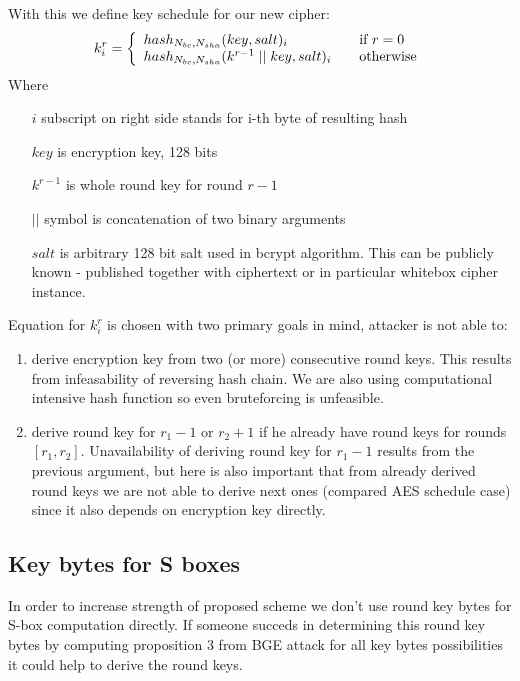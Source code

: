\documentclass[11pt,oneside,final]{fithesis2}
\begin{document}
    With this we define key schedule for our new cipher:
    \begin{equation}\label{eq:keySchedule}
    k_i^r = \left\{ 
    \begin{array}{l l} 
	hash_{N_{bc}, N_{sha}}(key, salt)_i                   & \quad \text{if $r=0$}\\
	hash_{N_{bc}, N_{sha}}(k^{r-1} \; || \;  key, salt)_i & \quad \text{otherwise}
    \end{array} \right.
    \end{equation}
    Where
    \begin{itemize}
     \item[$i$] subscript on right side stands for i-th byte of resulting hash
     \item[$key$] is encryption key, 128 bits
     \item[$k^{r-1}$] is whole round key for round $r-1$
     \item[$||$] symbol is concatenation of two binary arguments
     \item[$salt$] is arbitrary 128 bit salt used in bcrypt algorithm. This can be publicly known - published together with ciphertext or 
	in particular whitebox cipher instance.
    \end{itemize}

    Equation for $k_i^r$ is chosen with two primary goals in mind, attacker is not able to:
    \begin{enumerate}
     \item derive encryption key from two (or more) consecutive round keys. This results from infeasability of reversing hash chain. 
	We are also using computational intensive hash function so even bruteforcing is unfeasible.
     \item derive round key for $r_1-1$ or $r_2+1$ if he already have round keys for rounds $[r_1, r_2]$. Unavailability of deriving 
	round key for $r_1-1$ results from the previous argument, but here is also important that from already derived round keys we are not able to derive 	
	next ones (compared AES schedule case) since it also depends on encryption key directly.
    \end{enumerate}
    
    \subsection{Key bytes for S boxes}
    In order to increase strength of proposed scheme we don't use round key bytes for S-box computation directly. If someone succeds in determining 
    this round key bytes by computing proposition 3 from BGE attack for all key bytes possibilities it could help to derive the round keys.
    
\end{document}
